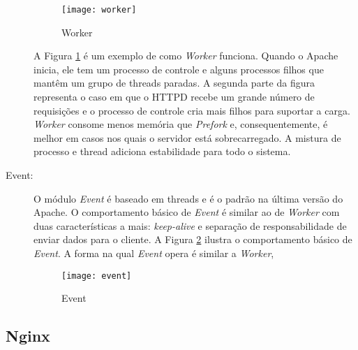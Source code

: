 \begin{description}
\begin{figure}[!h]
  \centering
  \texttt{[image: worker]} 
  \caption{Worker}
  \label{fig:worker} 
\end{figure}

A Figura \ref{fig:worker} é um exemplo de como \emph{Worker} funciona.
Quando o Apache inicia, ele tem um processo de controle e alguns processos
filhos que mantêm um grupo de threads paradas. A segunda parte da figura
representa o caso em que o HTTPD recebe um grande número de requisições e o
processo de controle cria mais filhos para suportar a carga. \emph{Worker}
consome menos memória que \emph{Prefork} e, consequentemente, é melhor em
casos nos quais o servidor está sobrecarregado.  A mistura de processo e thread
adiciona estabilidade para todo o sistema.

	\item [Event:] O módulo \emph{Event} é baseado em threads e é o padrão na
última versão do Apache. O comportamento básico de \emph{Event} é similar ao
de \emph{Worker} com duas características a mais: \emph{keep-alive} e
separação de responsabilidade de enviar dados para o cliente. A Figura
\ref{fig:event} ilustra o comportamento básico de \emph{Event}. A forma na
qual \emph{Event} opera é similar a \emph{Worker}, 

\begin{figure}[!h]
  \centering
  \texttt{[image: event]} 
  \caption{Event}
  \label{fig:event} 
\end{figure}

\end{description}

\subsection{Nginx}

